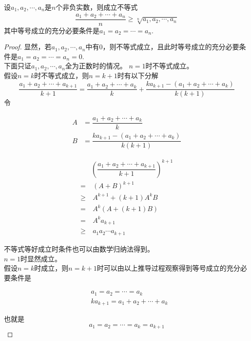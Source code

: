\begin{theorem}
    
    设$a_1,a_2,\cdots,a_n$是$n$个非负实数，则成立不等式
    $$\dfrac{a_1+a_2+\cdots+a_n}{n}\geq \sqrt[n]{a_1,a_2,\cdots,a_n}$$
    其中等号成立的充分必要条件是$a_1=a_2=\cdots=a_n$.

\end{theorem}

\begin{proof}
    
    显然，若$a_1,a_2,\cdots,a_n$中有$0$，则不等式成立，且此时等号成立的充分必要条件是$a_1=a_2=\cdots=a_n=0$.\\
    下面只证$a_1,a_2,\cdots,a_n$全为正数时的情况。
    $n=1$时不等式成立。\\
    假设$n=k$时不等式成立，则$n=k+1$时有以下分解
    $$\dfrac{a_1+a_2+\cdots+a_{k+1}}{k+1} = \dfrac{a_1+a_2+\cdots+a_{k}}{k}+ \dfrac{ka_{k+1}-(a_1+a_2+\cdots+a_k)}{k(k+1)}$$
    令
    
    \begin{align*}
        A&=\dfrac{a_1+a_2+\cdots+a_{k}}{k}\\
        B&=\dfrac{ka_{k+1}-(a_1+a_2+\cdots+a_k)}{k(k+1)}
    \end{align*}

    \begin{align*}
        & \left(\dfrac{a_1+a_2+\cdots+a_{k+1}}{k+1}\right)^{k+1} \\
        = & \  (A+B)^{k+1}\\
        \geq & \  A^{k+1} + (k+1) A^k B\\
        = & \ A^k(A+(k+1)B)\\
        = & \ A^k a_{k+1}\\
        \geq & \ a_1 a_2 \cdots a_{k+1}
    \end{align*}

    不等式等好成立时条件也可以由数学归纳法得到。\\
    $n=1$时显然成立。\\
    假设$n=k$时成立，则$n=k+1$时可以由以上推导过程观察得到等号成立的充分必要条件是

    \begin{align*}
        & a_1 = a_2 = \cdots = a_k \\
        & ka_{k + 1} = a_1 + a_2 + \cdots + a_k
    \end{align*}

    也就是
    $$a_1 = a_2 = \cdots = a_k = a_{k + 1}$$
\end{proof}


